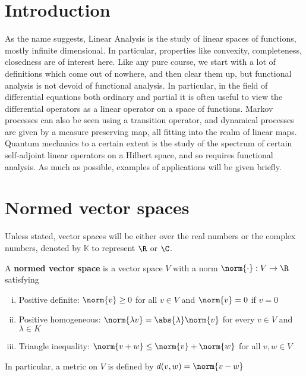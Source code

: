 \documentclass{article}
\newcommand{\K}{\mathbb{K}}
\begin{document}
\maketitle

\section{Introduction}
As the name suggests, Linear Analysis is the study of linear spaces of functions, mostly infinite dimensional. In particular, properties like convexity, completeness, closedness are of interest here.
Like any pure course, we start with a lot of definitions which come out of nowhere, and then clear them up, but functional analysis is not devoid of functional analysis. In particular, in the field of differential equations both ordinary and partial it is often useful to view the differential operators as a linear operator on a space of functions. Markov processes can also be seen using a transition operator, and dynamical processes are given by a measure preserving map, all fitting into the realm of linear maps.  Quantum mechanics to a certain extent is the study of the spectrum of certain self-adjoint linear operators on a Hilbert space, and so requires functional analysis.
As much as possible, examples of applications will be given briefly.

\section{Normed vector spaces}
Unless stated, vector spaces will be either over the real numbers or the complex numbers, denoted by $\K$ to represent $\R$ or $\C$.

\begin{defi}\label{def:normed_vector_space}
    A \textbf{normed vector space} is a vector space $V$ with a norm $\norm{\cdot}: V \to \R$ satisfying
    \begin{enumerate}[i.]
        \item Positive definite: $\norm{v} \geq 0$ for all $v \in V$ and $\norm{v} = 0$ if $v=0$
        \item Positive homogeneous: $\norm{\lambda v} = \abs{\lambda} \norm{v}$ for every $v \in V$ and $\lambda \in K$
        \item Triangle inequality: $\norm{v + w} \leq \norm{v} + \norm{w}$ for all $v, w \in V$
    \end{enumerate}
\end{defi}
In particular, a metric on $V$ is defined by $d(v, w) = \norm{v - w}$
\end{document}
